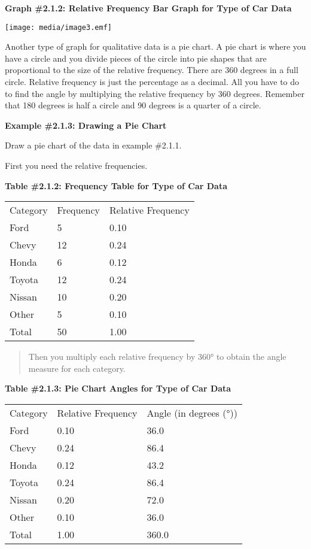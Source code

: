 \documentclass[]{book}
\begin{document}
\textbf{Graph \#2.1.2: Relative Frequency Bar Graph for Type of Car Data}

\texttt{[image: media/image3.emf]}

Another type of graph for qualitative data is a pie chart. A pie chart
is where you have a circle and you divide pieces of the circle into pie
shapes that are proportional to the size of the relative frequency.
There are 360 degrees in a full circle. Relative frequency is just the
percentage as a decimal. All you have to do to find the angle by
multiplying the relative frequency by 360 degrees. Remember that 180
degrees is half a circle and 90 degrees is a quarter of a circle.

\textbf{Example \#2.1.3: Drawing a Pie Chart}

Draw a pie chart of the data in example \#2.1.1.

First you need the relative frequencies.

\textbf{Table \#2.1.2: Frequency Table for Type of Car Data}

\begin{longtable}[]{@{}lll@{}}
\toprule
\endhead
Category & Frequency & Relative Frequency\tabularnewline
Ford & 5 & 0.10\tabularnewline
Chevy & 12 & 0.24\tabularnewline
Honda & 6 & 0.12\tabularnewline
Toyota & 12 & 0.24\tabularnewline
Nissan & 10 & 0.20\tabularnewline
Other & 5 & 0.10\tabularnewline
Total & 50 & 1.00\tabularnewline
\bottomrule
\end{longtable}

\begin{quote}
Then you multiply each relative frequency by 360° to obtain the angle
measure for each category.
\end{quote}

\textbf{Table \#2.1.3: Pie Chart Angles for Type of Car Data}

\begin{longtable}[]{@{}lll@{}}
\toprule
\endhead
Category & Relative Frequency & Angle (in degrees (°))\tabularnewline
Ford & 0.10 & 36.0\tabularnewline
Chevy & 0.24 & 86.4\tabularnewline
Honda & 0.12 & 43.2\tabularnewline
Toyota & 0.24 & 86.4\tabularnewline
Nissan & 0.20 & 72.0\tabularnewline
Other & 0.10 & 36.0\tabularnewline
Total & 1.00 & 360.0\tabularnewline
\bottomrule
\end{longtable}
\end{document}
